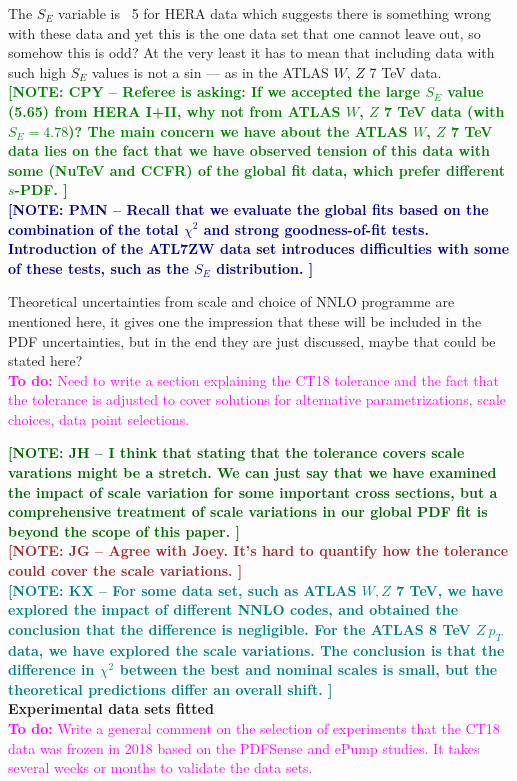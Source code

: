 \documentclass[aps,prd,amsmath,nofootinbib,floatfix,fleqn]{revtex4}
\newcommand{\TODO}[1]{\textcolor{magenta}{
\quad\vspace{3pt} \\ {\bf To do:} #1 \\
}}
\newcommand{\NOTECPY}[1]{\textcolor{green}{ \bf[NOTE: CPY -- #1 ]}}
\newcommand{\NOTEJH}[1]{\textcolor{darkgreen}{ \bf[NOTE: JH -- #1 ]}}
\newcommand{\NOTEPN}[1]{\textcolor{darkblue}{ \bf[NOTE: PMN -- #1 ]}}
\newcommand{\NOTEJG}[1]{\textcolor{brown}{ \bf[NOTE: JG -- #1 ]}}
\newcommand{\NOTEKX}[1]{\textcolor{teal}{ \bf[NOTE: KX -- #1 ]}}
\begin{document}
\noindent
 The $S_E$ variable is ~5 for HERA data which suggests there is something wrong with these data and yet this is the one data set that one cannot leave out, so somehow this is odd? At the very least it has to mean that including data with such high $S_E$ values is not a sin — as in the ATLAS $W$, $Z$ 7 TeV data. \\

\NOTECPY{Referee is asking: If we accepted the large $S_E$ value (5.65) from HERA I+II, why not from ATLAS $W$, $Z$ 7 TeV data (with $S_E=4.78$)?
The main concern we have about the  ATLAS $W$, $Z$ 7 TeV data lies on the fact that we have observed tension of this data with some (NuTeV and CCFR) of the global fit data, which prefer different $s$-PDF. 
}\\
\NOTEPN{Recall that we evaluate the global fits based on the combination of the total $\chi^2$ and strong goodness-of-fit tests. Introduction of the ATL7ZW data set introduces difficulties with some of these tests, such as the $S_E$ distribution.}

\noindent
Theoretical uncertainties from scale and choice of NNLO programme are mentioned here, it gives one the impression that these will be included in the PDF uncertainties, but in the end they are just discussed, maybe that could be stated here? 
\TODO{Need to write a section explaining the CT18 tolerance and the fact that the tolerance is adjusted to cover solutions for alternative parametrizations, scale choices, data point selections.}

\NOTEJH{I think that stating that the tolerance covers scale varations might be a stretch. We can just say that we have examined the impact of scale variation for some important cross sections, but a comprehensive treatment of scale variations in our global PDF fit is beyond the scope of this paper.}\\

\NOTEJG{Agree with Joey. It's hard to quantify how the tolerance could cover the scale variations.}\\
\NOTEKX{For some data set, such as ATLAS $W,Z$ 7 TeV, we have explored the impact of different NNLO codes, and obtained the conclusion that the difference is negligible. For the ATLAS 8 TeV $Z~p_T$ data, we have explored the scale variations. The conclusion is that the difference in $\chi^2$ between the best and nominal scales is small, but the theoretical predictions differ an overall shift.
}\\

{\bf Experimental data sets fitted}
\TODO{Write a general comment on the selection of experiments that the CT18 data was frozen in 2018 based on the PDFSense and ePump studies. It takes several weeks or months to validate the data sets.}
\end{document}
